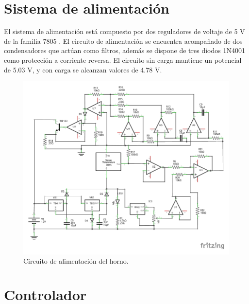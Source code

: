 \documentclass{wileysix}
\begin{document}
\section{Sistema de alimentaci\'on}
El sistema de alimentaci\'on est\'a compuesto por dos reguladores de voltaje de 5 V de la familia 7805 \cite{7805}. El circuito de alimentaci\'on se encuentra acompa\~nado de dos condensadores que act\'uan como filtros, adem\'as se dispone de tres diodos 1N4001 \cite{1N4001} como protecci\'on a corriente reversa. El circuito sin carga mantiene un potencial de 5.03 V, y con carga se alcanzan valores de 4.78 V.
\begin{figure}[h]
	\centering
	\includegraphics[width=0.9\linewidth]{extras/alimentacion.pdf}
	\caption{Circuito de alimentaci\'on del horno.}
\end{figure}
\section{Controlador}
\end{document}
